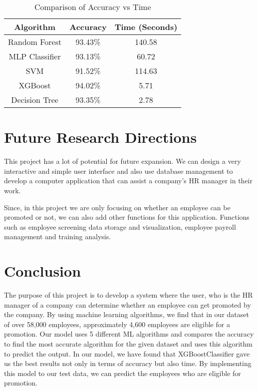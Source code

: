 \documentclass[11pt,conference]{IEEEtran}
\begin{document}
\begin{table}[htbp]
\caption{Comparison of Accuracy vs Time}
\begin{center}
\begin{tabular}{|c|c|c|}
\hline
\textbf{Algorithm} & \textbf{Accuracy}& \textbf{Time (Seconds)} \\
\hline
Random Forest & 93.43\% & 140.58 \\ \hline
MLP Classifier & 93.13\% & 60.72 \\ \hline
SVM & 91.52\% & 114.63 \\ \hline
XGBoost & 94.02\% & 5.71 \\ \hline
Decision Tree & 93.35\% & 2.78 \\ \hline
\end{tabular}
\label{tab1}
\end{center}
\end{table}

\section{Future Research Directions}
This project has a lot of potential for future expansion. We can design a very interactive and simple user interface and also use database management to develop a computer application that can assist a company’s HR manager in their work.\par
Since, in this project we are only focusing on whether an employee can be promoted or not, we can also add other functions for this application. Functions such as employee screening data storage and visualization, employee payroll management and training analysis.

\section{Conclusion}
The purpose of this project is to develop a system
where the user, who is the HR manager of a company can
determine whether an employee can get promoted by the
company. By using machine learning algorithms,
we find that in our dataset of over 58,000 employees,
approximately 4,600 employees are eligible for a promotion. Our
model uses 5 different ML algorithms and compares the
accuracy to find the most accurate algorithm for the given
dataset and uses this algorithm to predict the output. In our model, we have found that XGBoostClassifier gave us the best results not only in terms of accuracy but also time. By implementing this model to our test data, we can predict the employees who are eligible for promotion.
\end{document}
